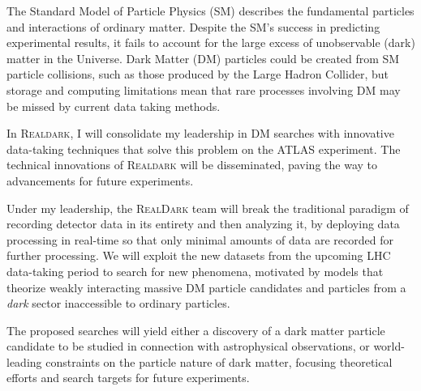 \documentclass[11pt,a4paper]{article}
\begin{document}

The Standard Model of Particle Physics (SM) describes the fundamental particles and interactions of ordinary matter. Despite the SM's success in predicting experimental results, it fails to account for the large excess of unobservable (dark) matter in the Universe. 
Dark Matter (DM) particles could be created from SM particle collisions, such as those produced by the Large Hadron Collider, but storage and computing limitations mean that rare processes involving DM may be missed by current data taking methods. 

In \textsc{Realdark}, I will consolidate my leadership in DM searches with innovative data-taking techniques that solve this problem on the ATLAS experiment. The technical innovations of \textsc{Realdark} will be disseminated, paving the way to advancements for future experiments.

Under my leadership, the \textsc{RealDark} team will break the traditional paradigm of recording detector data in its entirety and then analyzing it, by deploying data processing in real-time so that only minimal amounts of data are recorded for further processing. 
We will exploit the new datasets from the upcoming LHC data-taking period to search for new phenomena, motivated by models that theorize weakly interacting massive DM particle candidates and particles from a \textit{dark} sector inaccessible to ordinary particles. 

The proposed searches will yield either a discovery of a dark matter particle candidate to be studied in connection with astrophysical observations, or world-leading constraints on the particle nature of dark matter, focusing theoretical efforts and search targets for future experiments.  
\end{document}
